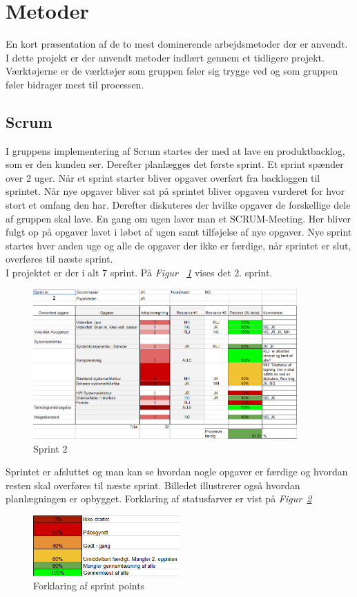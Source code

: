 \section{Metoder}
\label{ch:metoder}
En kort præsentation af de to mest dominerende arbejdsmetoder der er anvendt.\\

I dette projekt er der anvendt metoder indlært gennem et tidligere projekt. Værktøjerne er de værktøjer som gruppen føler sig trygge ved og som gruppen føler bidrager mest til processen. 
\subsection{Scrum}
I gruppens implementering af Scrum startes der med at lave en produktbacklog, som er den kunden ser.  Derefter planlægges det første sprint. Et sprint spænder over 2 uger. Når et sprint starter bliver opgaver overført fra backloggen til sprintet. Når nye opgaver bliver sat på sprintet bliver opgaven vurderet for hvor stort et omfang den har. Derefter diskuteres der hvilke opgaver de forskellige dele af gruppen skal lave. En gang om ugen laver man et SCRUM-Meeting. Her bliver fulgt op på opgaver lavet i løbet af ugen samt tilføjelse af nye opgaver. Nye sprint startes hver anden uge og alle de opgaver der ikke er færdige, når sprintet er slut, overføres til næste sprint.\\
I projektet er der i alt 7 sprint. På \textit{Figur ~\ref{fig:SCRUM}} vises det 2. sprint.
\begin{figure}[H]
\centering
\includegraphics[width=0.9\textwidth]{billeder/SCRUM1}
\caption{Sprint 2}
\label{fig:SCRUM}
\end{figure}
Sprintet er afsluttet og man kan se hvordan nogle opgaver er færdige og hvordan resten skal overføres til næste sprint. Billedet illustrerer også hvordan planlægningen er opbygget. Forklaring af statusfarver er vist på \textit{Figur~\ref{fig:SCRUM2}}
\begin{figure}[H]
\centering
\includegraphics[width=0.5\textwidth]{billeder/SCRUM2}
\caption{Forklaring af sprint points}
\label{fig:SCRUM2}
\end{figure}
